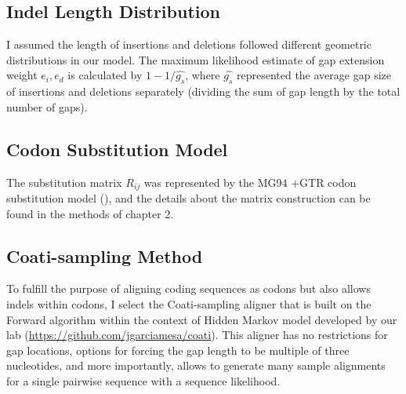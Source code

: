 \subsection{Indel Length Distribution}
I assumed the length of insertions and deletions followed different geometric distributions in our model. The maximum likelihood estimate of gap extension weight $e_i, e_d$ is calculated by $ 1-1/\hat{g_s}$, where $\hat{g_s}$ represented the average gap size of insertions and deletions separately (dividing the sum of gap length by the total number of gaps).   

\subsection{Codon Substitution Model}
The substitution matrix $R_{ij}$ was represented by the MG94 +GTR codon substitution model (\cite{muse1994likelihood, tavare1986some}), and the details about the matrix construction can be found in the methods of chapter 2. 

\subsection{Coati-sampling Method}
To fulfill the purpose of aligning coding sequences as codons but also allows indels within codons, I select the Coati-sampling aligner that is built on the Forward algorithm within the context of Hidden Markov model developed by our lab (\href{https://github.com/jgarciamesa/coati}{https://github.com/jgarciamesa/coati}). This aligner has no restrictions for gap locations, options for forcing the gap length to be multiple of three nucleotides, and more importantly, allows to generate many sample alignments for a single pairwise sequence with a sequence likelihood.  

